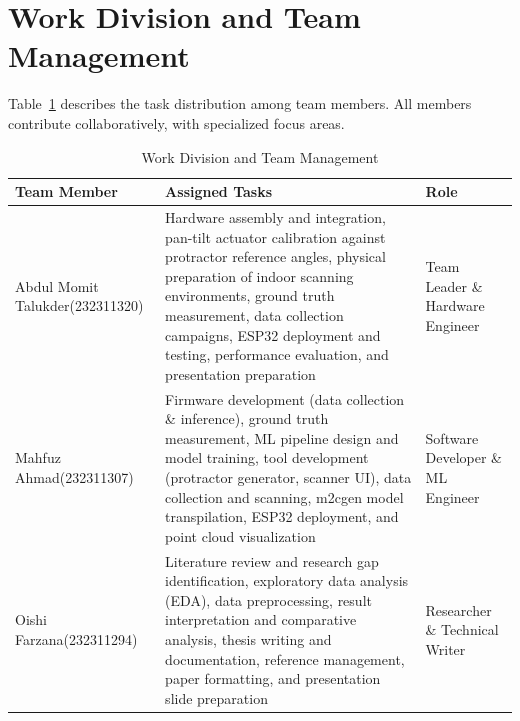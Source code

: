 \documentclass[12pt,a4paper]{article}
\begin{document}

    \section{Work Division and Team Management}

    Table~\ref{tab:work-division} describes the task distribution among team members. All members contribute collaboratively, with specialized focus areas.

    \begin{table}[H]
    \centering
    \caption{Work Division and Team Management}
    \label{tab:work-division}
    \begin{tabularx}{\textwidth}{|>{\raggedright\arraybackslash}p{1.6in}|X|>{\raggedright\arraybackslash}p{1.3in}|}
    \hline
    \textbf{Team Member} &
    \textbf{Assigned Tasks} &
    \textbf{Role} \\
    \hline

    Abdul Momit Talukder\newline (232311320) &
    Hardware assembly and integration, pan-tilt actuator calibration against protractor reference angles, physical preparation of indoor scanning environments, ground truth measurement, data collection campaigns, ESP32 deployment and testing, performance evaluation, and presentation preparation &
    Team Leader \& Hardware Engineer \\
    \hline

    Mahfuz Ahmad\newline (232311307) &
    Firmware development (data collection \& inference), ground truth measurement, ML pipeline design and model training, tool development (protractor generator, scanner UI), data collection and scanning, m2cgen model transpilation, ESP32 deployment, and point cloud visualization &
    Software Developer \& ML Engineer \\
    \hline

    Oishi Farzana\newline (232311294) &
    Literature review and research gap identification, exploratory data analysis (EDA), data preprocessing, result interpretation and comparative analysis, thesis writing and documentation, reference management, paper formatting, and presentation slide preparation &
    Researcher \& Technical Writer \\
    \hline

    \end{tabularx}
    \end{table}
\end{document}
